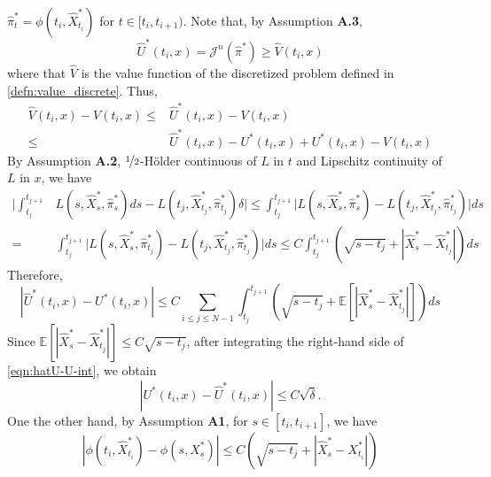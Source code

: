 \documentclass{article}
\numberwithin{equation}{section}
\begin{document}
$\hat{\pi}^*_t=\phi(t_{i},\hat{X}^*_{t_{i}})$ for $t\in[t_i,t_{i+1})$.
Note that, by Assumption \textbf{A.3}, 
\begin{equation}
    \hat{U}^*(t_{i},x) = \mathcal{J}^n(\hat{\pi}^*)\ge \hat{V}(t_i,x)
\end{equation}
where  that $\hat{V}$ is the value function of the discretized problem defined in \eqref{defn:value_discrete}.
Thus, 
\begin{equation}
    \begin{split}
        \hat{V}(t_{i},x)-{V}(t_{i},x)\le  & \hat{U}^*(t_{i},x)-{V}(t_{i},x)\\
        \le & \hat{U}^*(t_{i},x)-
        U^*(t_{i},x)+{U}^*(t_{i},x)-{V}(t_{i},x)
    \end{split}
\end{equation}
By Assumption \textbf{A.2},  $\nicefrac{1}{2}$-Hölder continuous  of $L$ in $t$ and Lipschitz continuity of $L$ in $x$, we have 
\begin{equation}
\begin{split}
    \bigg|\int_{t_{j}}^{t_{j+1}} &\!\!\!\!\!\!\! L(s,\hat{X}^*_{s},\hat{\pi}^*_{s})ds-L(t_{j},\hat{X}^*_{t_{j}},\hat{\pi}^*_{t_j})\delta\bigg|\le \int_{t_{j}}^{t_{j+1}} \!\!\!\!\!\!\!\big|L(s,\hat{X}^*_{s},\hat{\pi}^*_{s})-L(t_{j},\hat{X}^*_{t_{j}},\hat{\pi}^*_{t_j})\big|ds\\
    = &\int_{t_{j}}^{t_{j+1}} \!\!\!\!\!\!\! \big|L(s,\hat{X}^*_{s},\hat{\pi}^*_{t_j})-L(t_{j},\hat{X}^*_{t_{j}},\hat{\pi}^*_{t_j})\big|ds \le  C \int_{t_{j}}^{t_{j+1}}\!\!\!\!\!\!\! (\sqrt{s-t_j}+|\hat{X}^*_{s}-\hat{X}^*_{t_{j}}|)ds
\end{split}
\end{equation}
Therefore, 
\begin{equation}\label{eqn:hatU-U-int}
    |\hat{U}^*(t_{i},x)-{U}^*(t_{i},x)|\le C\sum_{i\le j\le N-1} \int_{t_{j}}^{t_{j+1}}\!\!\!\!\!\!\! (\sqrt{s-t_j}+\mathbb{E}[|\hat{X}^*_{s}-\hat{X}^*_{t_{j}}|])ds
\end{equation}
Since $\mathbb{E}[|\hat{X}^*_{s}-\hat{X}^*_{t_{j}}|]\le C\sqrt{s-t_j}$, after integrating the right-hand side of \eqref{eqn:hatU-U-int}, we obtain
\begin{equation}\label{eqn:hatU-U}
    |{U}^*(t_{i},x)-\hat{U}^*(t_{i},x)|\le C\sqrt{\delta}.
\end{equation}
One the other hand, by Assumption \textbf{A1}, for $s\in[t_{i},t_{i+1}]$, we have
\begin{equation}\label{phi-phi}
    |\phi(t_i,\hat{X}_{t_i}^{*})-\phi(s,{X}_{s}^{*})|\le C(\sqrt{s-t_j}+|\hat{X}^*_{s}-{X}^*_{t_i}|)
\end{equation}
\end{document}
